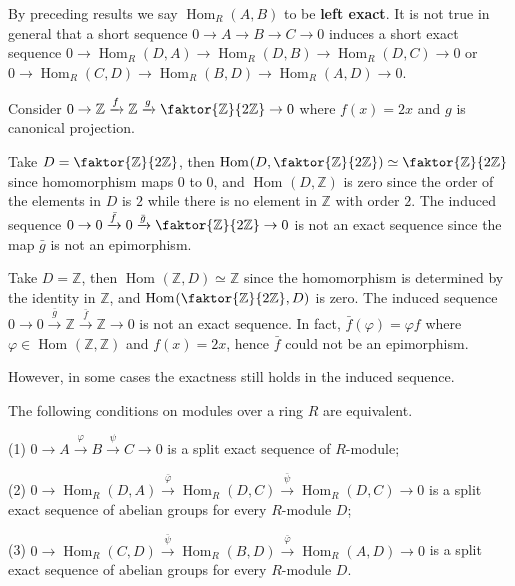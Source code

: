 \documentclass{article}
\DeclareMathOperator{\Hom}{Hom}
\begin{document}
By preceding results we say $\Hom_{R}(A, B)$ to be \textbf{left exact}. It is not true in general that a short sequence $0\to A\to B\to C\to 0$ induces a short exact sequence $0\to \Hom_{R}(D, A)\to \Hom_{R}(D, B)\to \Hom_{R}(D, C)\to 0$ or $0\to \Hom_{R}(C, D)\to \Hom_{R}(B, D)\to \Hom_{R}(A, D)\to 0$.

\begin{example}
    Consider $0\to \mathbb{Z}\xrightarrow{f}\mathbb{Z}\xrightarrow{g}\faktor{\mathbb{Z}}{2\mathbb{Z}}\to 0$ where $f(x)=2x$ and $g$ is canonical projection. 
    
    Take $D=\faktor{\mathbb{Z}}{2\mathbb{Z}}$, then $\Hom_{}(D, \faktor{\mathbb{Z}}{2\mathbb{Z}})\simeq \faktor{\mathbb{Z}}{2\mathbb{Z}}$ since homomorphism maps $0$ to $0$, and $\Hom_{}(D, \mathbb{Z})$ is zero since the order of the elements in $D$ is $2$ while there is no element in $\mathbb{Z}$ with order $2$. The induced sequence $0\to 0\xrightarrow{\bar{f}} 0\xrightarrow{\bar{g}}\faktor{\mathbb{Z}}{2\mathbb{Z}}\to 0$ is not an exact sequence since the map $\bar{g}$ is not an epimorphism.

    Take $D=\mathbb{Z}$, then $\Hom_{}(\mathbb{Z}, D)\simeq \mathbb{Z}$ since the homomorphism is determined by the identity in $\mathbb{Z}$, and $\Hom_{}(\faktor{\mathbb{Z}}{2\mathbb{Z}}, D)$ is zero. The induced sequence $0\to 0\xrightarrow{\bar{g}}\mathbb{Z}\xrightarrow{\bar{f}}\mathbb{Z}\to 0$ is not an exact sequence. In fact, $\bar{f}(\varphi)=\varphi f$ where $\varphi \in \Hom_{}(\mathbb{Z}, \mathbb{Z})$ and $f(x)=2x$, hence $\bar{f}$ could not be an epimorphism.
\end{example}

However, in some cases the exactness still holds in the induced sequence.


\begin{theorem}
    The following conditions on modules over a ring $R$ are equivalent.

    (1) $0\to A\xrightarrow{\varphi}B\xrightarrow{\psi}C\to 0$ is a split exact sequence of $R$-module;

    (2) $0\to \Hom_{R}(D, A)\xrightarrow{\bar{\varphi}} \Hom_{R}(D, C)\xrightarrow{\bar{\psi}}\Hom_{R}(D, C)\to 0$ is a split exact sequence of abelian groups for every $R$-module $D$;

    (3) $0\to \Hom_{R}(C, D)\xrightarrow{\bar{\psi}} \Hom_{R}(B, D)\xrightarrow{\bar{\varphi}}\Hom_{R}(A, D)\to 0$ is a split exact sequence of abelian groups for every $R$-module $D$.
\end{theorem}
\end{document}
